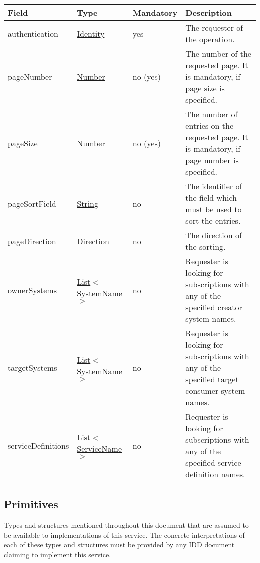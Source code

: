 \documentclass[a4paper]{arrowhead}
\newcommand{\pref}[1]{{\textcolor{ArrowheadGrey}{\hyperref[sec:model:primitives:#1]{#1}}}}
\begin{document}

\begin{table}[ht!]
\begin{tabularx}{\textwidth}{| p{3cm} | p{3.5cm} | p{2cm} | X |} \hline
\rowcolor{gray!33} Field & Type & Mandatory & Description \\ \hline
authentication & \hyperref[sec:model:Identity]{Identity} & yes & The requester of the operation. \\ \hline
pageNumber & \pref{Number} & no (yes) & The number of the requested page. It is mandatory, if page size is specified. \\ \hline
pageSize & \pref{Number} & no (yes) & The number of entries on the requested page. It is mandatory, if page number is specified. \\ \hline
pageSortField & \pref{String} & no & The identifier of the field which must be used to sort the entries. \\ \hline
pageDirection & \pref{Direction} & no & The direction of the sorting. \\ \hline
ownerSystems &  \pref{List}$<$\pref{SystemName}$>$ & no & Requester is looking for subscriptions with any of the specified creator system names. \\ \hline
targetSystems &  \pref{List}$<$\pref{SystemName}$>$ & no & Requester is looking for subscriptions with any of the specified target consumer system names. \\ \hline
serviceDefinitions &  \pref{List}$<$\pref{ServiceName}$>$ & no & Requester is looking for subscriptions with any of the specified service definition names. \\ \hline
\end{tabularx}
\end{table}
 

\clearpage

\subsection{Primitives}
\label{sec:model:primitives}

Types and structures mentioned throughout this document that are assumed to be available to implementations of this service.
The concrete interpretations of each of these types and structures must be provided by any IDD document claiming to implement this service.
\end{document}
